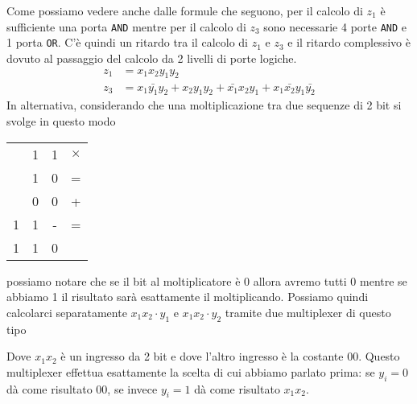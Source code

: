 Come possiamo vedere anche dalle formule che seguono, per il calcolo di $z_1$ è sufficiente una
porta \verb|AND| mentre per il calcolo di $z_3$ sono necessarie 4 porte \verb|AND| e 1 porta
\verb|OR|. C'è quindi un ritardo tra il calcolo di $z_1$ e $z_3$ e il ritardo complessivo è dovuto
al passaggio del calcolo da 2 livelli di porte logiche.
\begin{align*}
	z_1 & = x_1 x_2 y_1 y_2                                                                   \\
	z_3 & = x_1 \bar{y_1} y_2 + x_2 y_1 y_2 + \bar{x_1} x_2 y_1 + x_1 \bar{x_2} y_1 \bar{y_2}
\end{align*}
In alternativa, considerando che una moltiplicazione tra due sequenze di 2 bit si svolge in questo
modo
\begin{center}
	\begin{tabular}{c c c c}
		  & 1 & 1 & $\times$ \\
		  & 1 & 0 & =        \\ \hline
		  & 0 & 0 & +        \\
		1 & 1 & - & =        \\ \hline
		1 & 1 & 0
	\end{tabular}
\end{center}
possiamo notare che se il bit al moltiplicatore è 0 allora avremo tutti 0 mentre se abbiamo 1 il
risultato sarà esattamente il moltiplicando. Possiamo quindi calcolarci separatamente
$x_1 x_2 \cdot y_1$ e $x_1 x_2 \cdot y_2$ tramite due multiplexer di questo tipo
\begin{center}
\end{center}
Dove $x_1 x_2$ è un ingresso da 2 bit e dove l'altro ingresso è la costante 00. Questo multiplexer
effettua esattamente la scelta di cui abbiamo parlato prima: se $y_i = 0$ dà come risultato 00, se
invece $y_i = 1$ dà come risultato $x_1 x_2$.


